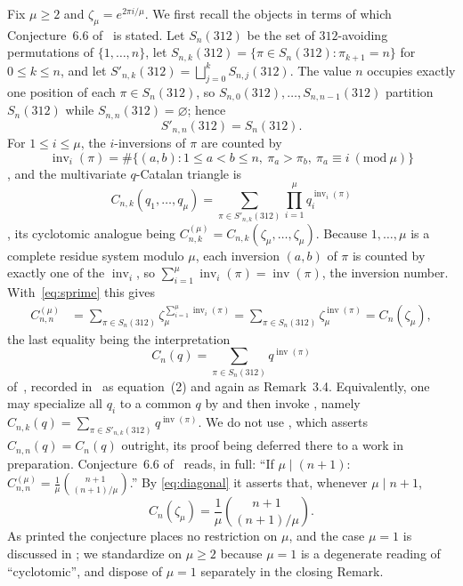 \documentclass[11pt]{amsart}
\theoremstyle{remark}
\begin{document}
Fix $\mu\ge2$ and $\zeta_\mu=e^{2\pi i/\mu}$. We first recall the
objects in terms of which Conjecture~6.6 of~\cite{Wirdane} is stated.
Let $S_n(312)$ be the set of $312$-avoiding permutations of
$\{1,\ldots,n\}$, let $S_{n,k}(312)=\{\pi\in S_n(312):\pi_{k+1}=n\}$
for $0\le k\le n$, and let
$S'_{n,k}(312)=\bigsqcup_{j=0}^{k}S_{n,j}(312)$. The value $n$ occupies
exactly one position of each $\pi\in S_n(312)$, so
$S_{n,0}(312),\ldots,S_{n,n-1}(312)$ partition $S_n(312)$ while
$S_{n,n}(312)=\varnothing$; hence
\begin{equation}\label{eq:sprime}
  S'_{n,n}(312)=S_n(312).
\end{equation}
For $1\le i\le\mu$, the $i$-inversions of $\pi$ are counted by
\[
  \operatorname{inv}_i(\pi)
  =\#\bigl\{(a,b):1\le a<b\le n,\ \pi_a>\pi_b,\
      \pi_a\equiv i\ (\mathrm{mod}\ \mu)\bigr\}
\]
\cite[Definition~6.1]{Wirdane}, and the multivariate $q$-Catalan
triangle is
\[
  C_{n,k}(q_1,\ldots,q_\mu)
  =\sum_{\pi\in S'_{n,k}(312)}\prod_{i=1}^{\mu}
     q_i^{\operatorname{inv}_i(\pi)}
\]
\cite[Definition~6.2]{Wirdane}, its cyclotomic analogue being
$C_{n,k}^{(\mu)}=C_{n,k}(\zeta_\mu,\ldots,\zeta_\mu)$. Because
$1,\ldots,\mu$ is a complete residue system modulo $\mu$, each
inversion $(a,b)$ of $\pi$ is counted by exactly one of the
$\operatorname{inv}_i$, so
$\sum_{i=1}^{\mu}\operatorname{inv}_i(\pi)=\operatorname{inv}(\pi)$,
the inversion number. With~\eqref{eq:sprime} this gives
\begin{align}\label{eq:diagonal}
  C_{n,n}^{(\mu)}
  &=\sum_{\pi\in S_n(312)}
       \zeta_\mu^{\sum_{i=1}^{\mu}\operatorname{inv}_i(\pi)}
    =\sum_{\pi\in S_n(312)}
       \zeta_\mu^{\operatorname{inv}(\pi)}
    =C_n(\zeta_\mu),
\end{align}
the last equality being the interpretation
\[
  C_n(q)=\sum_{\pi\in S_n(312)}q^{\operatorname{inv}(\pi)}
\]
of~\cite{FH}, recorded in~\cite{Wirdane} as equation~(2) and again as
Remark~3.4. Equivalently, one may specialize all $q_i$ to a common $q$
by \cite[Corollary~6.5]{Wirdane} and then invoke
\cite[Theorem~3.3]{Wirdane}, namely
$C_{n,k}(q)=\sum_{\pi\in S'_{n,k}(312)}q^{\operatorname{inv}(\pi)}$.
We do not use \cite[Proposition~2.4]{Wirdane}, which asserts
$C_{n,n}(q)=C_n(q)$ outright, its proof being deferred there to a work
in preparation.
Conjecture~6.6 of~\cite{Wirdane} reads, in full: ``If $\mu\mid(n+1)$:
$C_{n,n}^{(\mu)}=\frac{1}{\mu}\binom{n+1}{(n+1)/\mu}$.'' By
\eqref{eq:diagonal} it asserts that, whenever $\mu\mid n+1$,
\begin{equation}\label{eq:conjecture}
  C_n(\zeta_\mu)
  =\frac{1}{\mu}\binom{n+1}{(n+1)/\mu}.
\end{equation}
As printed the conjecture places no restriction on $\mu$, and the case
$\mu=1$ is discussed in \cite[Remark~6.4]{Wirdane}; we standardize on
$\mu\ge2$ because $\mu=1$ is a degenerate reading of ``cyclotomic'',
and dispose of $\mu=1$ separately in the closing Remark.
\end{document}
